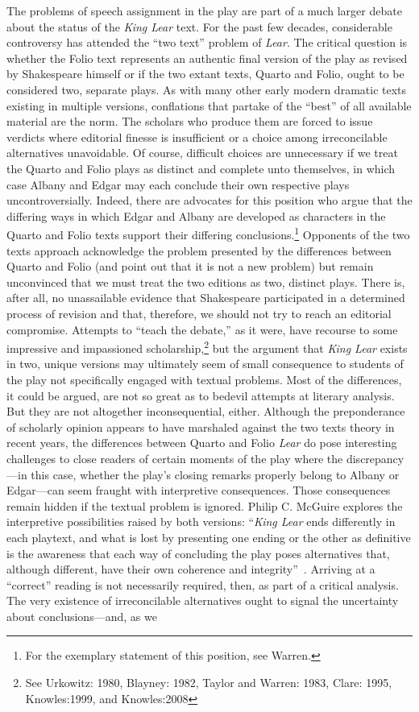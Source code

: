 The problems of speech assignment in the play are part of a much larger debate about the status of the \emph{King Lear} text. For the past few decades, considerable controversy has attended the ``two text'' problem of \emph{Lear}. The critical question is whether the Folio text represents an authentic final version of the play as revised by Shakespeare himself or if the two extant texts, Quarto and Folio, ought to be considered two, separate plays. As with many other early modern dramatic texts existing in multiple versions, conflations that partake of the ``best'' of all available material are the norm. The scholars who produce them are forced to issue verdicts where editorial finesse is insufficient or a choice among irreconcilable alternatives unavoidable. Of course, difficult choices are unnecessary if we treat the Quarto and Folio plays as distinct and complete unto themselves, in which case Albany and Edgar may each conclude their own respective plays uncontroversially. Indeed, there are advocates for this position who argue that the differing ways in which Edgar and Albany are developed as characters in the Quarto and Folio texts support their differing conclusions.\footnote{For the exemplary statement of this position, see Warren.\nocite{Warren}} Opponents of the two texts approach acknowledge the problem presented by the differences between Quarto and Folio (and point out that it is not a new problem) but remain unconvinced that we must treat the two editions as two, distinct plays. There is, after all, no unassailable evidence that Shakespeare participated in a determined process of revision and that, therefore, we should not try to reach an editorial compromise. Attempts to ``teach the debate,'' as it were, have recourse to some impressive and impassioned scholarship,\footnote{See Urkowitz: 1980, Blayney: 1982, Taylor and Warren: 1983, Clare: 1995, Knowles:1999, and Knowles:2008} but the argument that \emph{King Lear} exists in two, unique versions may ultimately seem of small consequence to students of the play not specifically engaged with textual problems. Most of the differences, it could be argued, are not so great as to bedevil attempts at literary analysis. But they are not altogether inconsequential, either. Although the preponderance of scholarly opinion appears to have marshaled against the two texts theory in recent years, the differences between Quarto and Folio \emph{Lear} do pose interesting challenges to close readers of certain moments of the play where the discrepancy---in this case, whether the play's closing remarks properly belong to Albany or Edgar---can seem fraught with interpretive consequences. Those consequences remain hidden if the textual problem is ignored. Philip C. McGuire explores the interpretive possibilities raised by both versions: ``\emph{King Lear} ends differently in each playtext, and what is lost by presenting one ending or the other as definitive is the awareness that each way of concluding the play poses alternatives that, although different, have their own coherence and integrity''~\cite[108]{PhilipMcGuire}. Arriving at a ``correct'' reading is not necessarily required, then, as part of a critical analysis. The very existence of irreconcilable alternatives ought to signal the uncertainty about conclusions---and, as we 